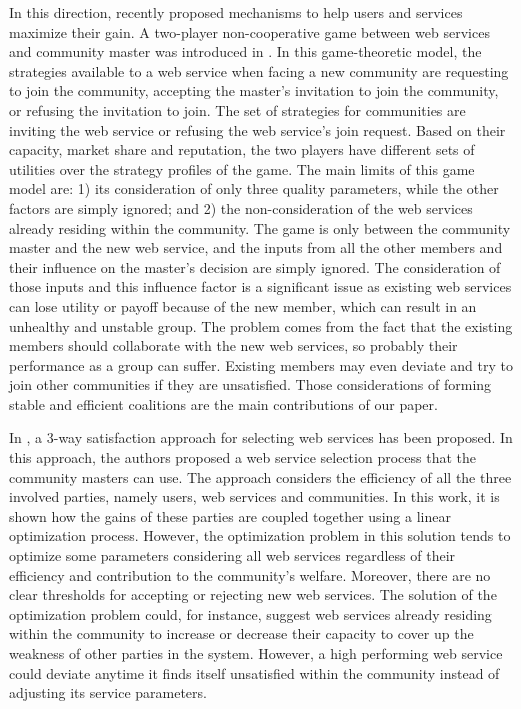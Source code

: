 In this direction, recently \cite{DBLP:conf/IEEEscc/LimTMB12,
DBLP:conf/IEEEscc/KhosravifarABT11, 10.1109/TSC.2012.12} proposed
mechanisms to help users and services maximize their gain. A
two-player non-cooperative game between web services and community
master was introduced in
\cite{DBLP:conf/IEEEscc/KhosravifarABT11}. In this game-theoretic
model, the strategies available to a web service when facing a new
community are requesting to join the community, accepting the
master's invitation to join the community, or refusing the
invitation to join. The set of strategies for communities are
inviting the web service or refusing the web service's join
request. Based on their capacity, market share and reputation, the
two players have different sets of utilities over the strategy
profiles of the game. The main limits of this game model are: 1)
its consideration of only three quality parameters, while the
other factors are simply ignored; and 2) the non-consideration of
the web services already residing within the community. The game
is only between the community master and the new web service, and
the inputs from all the other members and their influence on the
master's decision are simply ignored. The consideration of those
inputs and this influence factor is a significant issue as
existing web services can lose utility or payoff because of the
new member, which can result in an unhealthy and unstable group.
The problem comes from the fact that the existing members should
collaborate with the new web services, so probably their
performance as a group can suffer. Existing members may even
deviate and try to join other communities if they are unsatisfied.
Those considerations of forming stable and efficient coalitions
are the main contributions of our paper.

In \cite{DBLP:conf/IEEEscc/LimTMB12}, a 3-way satisfaction approach
for selecting web services has been proposed. In this approach,
the authors proposed a web service selection process that the
community masters can use. The approach considers the efficiency
of all the three involved parties, namely users, web services and
communities. In this work, it is shown how the gains of these
parties are coupled together using a linear optimization process.
However, the optimization problem in this solution tends to
optimize some parameters considering all web services regardless
of their efficiency and contribution to the community's welfare.
Moreover, there are no clear thresholds for accepting or rejecting
new web services. The solution of the optimization problem could,
for instance, suggest web services already residing within the
community to increase or decrease their capacity to cover up the
weakness of other parties in the system. However, a high
performing web service could deviate anytime it finds itself
unsatisfied within the community instead of adjusting its service
parameters.

